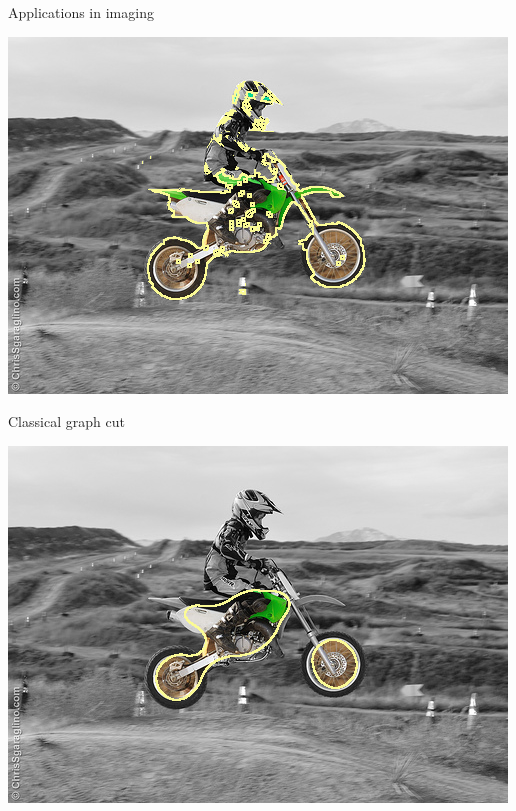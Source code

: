 \begin{frame}
{Applications in imaging}

\begin{minipage}[t][0.45\textheight][t]{\textwidth}
\center
\includegraphics[scale=0.25]{figures/applications-imaging/contour-correction/moto/gc-seg.png}

Classical graph cut
\end{minipage}
\begin{minipage}[t][0.55\textheight][t]{0.5\textwidth}
\center
\includegraphics[scale=0.25]{figures/applications-imaging/contour-correction/moto/corrected-seg-without-data.png}


\end{minipage}
\end{frame}
